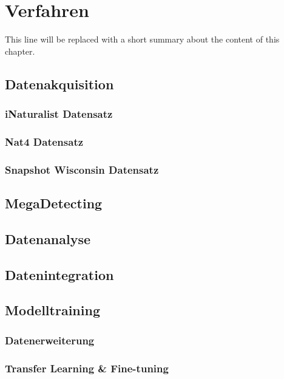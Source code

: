 \chapter{Verfahren}

This line will be replaced with a short summary about the content of this chapter.


\section{Datenakquisition}

\subsection{iNaturalist Datensatz}

\subsection{Nat4 Datensatz}

\subsection{Snapshot Wisconsin Datensatz}

\section{MegaDetecting}

\section{Datenanalyse}

\section{Datenintegration}

\section{Modelltraining}

\subsection{Datenerweiterung}

\subsection{Transfer Learning \& Fine-tuning}